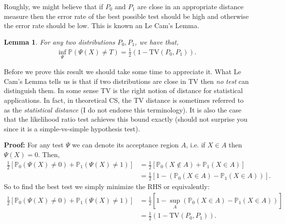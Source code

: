 \documentclass[twoside,12pt]{article}
\newtheorem{lemma}[theorem]{Lemma}
\begin{document}
Roughly, we might believe that if $P_0$ and $P_1$ are close in an appropriate distance measure then the error rate of the best possible test should be high and otherwise the error rate should be low. This is known an Le Cam's Lemma.

\begin{lemma}
For any two distributions $P_0, P_1$, we have that,
\begin{align*}
\inf_{\Psi} \mathbb{P}(\Psi(X) \neq T) = \frac{1}{2} \left( 1 - \text{TV}(P_0,P_1)\right).
\end{align*}
\end{lemma}
Before we prove this result we should take some time to appreciate it. What Le Cam's Lemma tells us is that if two distributions are close in TV then \emph{no test} can distinguish them. In some sense TV is the right notion of distance for statistical applications. In fact, in theoretical CS, the TV distance is sometimes referred to as the \emph{statistical distance} (I do not endorse this terminology). 
It is also the case that the likelihood ratio test achieves this bound exactly (should not surprise you since it is a simple-vs-simple hypothesis test). 

{\bf Proof: } For any test $\Psi$ we can denote its acceptance region $A$, i.e. if $X \in A$ then $\Psi(X) = 0$. Then,
\begin{align*}
\frac{1}{2} \left[ \mathbb{P}_0 (\Psi(X) \neq 0) + \mathbb{P}_1 (\Psi(X) \neq 1) \right] &= \frac{1}{2} \left[ 
 \mathbb{P}_0 (X \notin A) + \mathbb{P}_1 (X \in A) \right] \\
 &= \frac{1}{2} \left[ 1 - (\mathbb{P}_0 (X \in A) - \mathbb{P}_1 (X \in A))\right].
\end{align*}
So to find the best test we simply minimize the RHS or equivalently:
\begin{align*}
\frac{1}{2} \left[ \mathbb{P}_0 (\Psi(X) \neq 0) + \mathbb{P}_1 (\Psi(X) \neq 1) \right] &=
\frac{1}{2} \left[ 1 - \sup_{A} (\mathbb{P}_0 (X \in A) - \mathbb{P}_1 (X \in A))\right] \\
&= \frac{1}{2} \left( 1 - \text{TV}(P_0,P_1)\right).
\end{align*}
\end{document}
